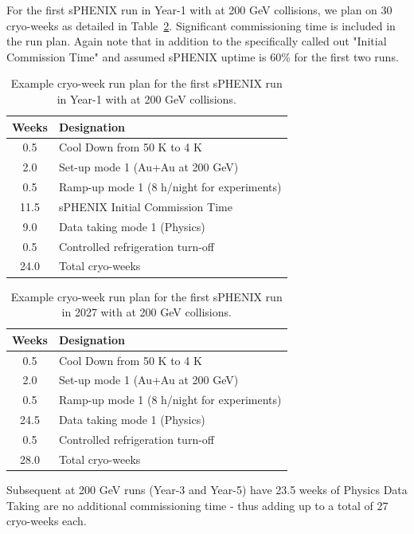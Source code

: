 For the first sPHENIX run in Year-1 with \auau at 200 GeV collisions, we plan on 30 cryo-weeks as detailed in Table~\ref{tab:cryoplan2022}.  Significant commissioning time is included in the run plan.   Again note that in addition to the specifically called out "Initial Commission Time" and assumed sPHENIX uptime is 60\% for the first two runs.

\begin{table}
\centering
\begin{tabular}{ | c | l | }
\hline
Weeks & Designation \\ \hline
0.5  & Cool Down from 50 K to 4 K \\ \hline
2.0  & Set-up mode 1 (Au+Au at 200 GeV) \\ \hline
0.5  & Ramp-up mode 1 (8 h/night for experiments) \\ \hline
11.5  & sPHENIX Initial Commission Time \\ \hline
9.0 & Data taking mode 1 (Physics) \\ \hline
0.5  & Controlled refrigeration turn-off \\ \hline \hline \hline
24.0 & Total cryo-weeks \\
\hline
\end{tabular}
\caption{Example cryo-week run plan for the first sPHENIX run in Year-1 with \auau at 200 GeV collisions.\label{tab:cryoplan2022}}
\end{table}

\begin{table}
\centering
\begin{tabular}{ | c | l | }
\hline
Weeks & Designation \\ \hline
0.5  & Cool Down from 50 K to 4 K \\ \hline
2.0  & Set-up mode 1 (Au+Au at 200 GeV) \\ \hline
0.5  & Ramp-up mode 1 (8 h/night for experiments) \\ \hline
24.5 & Data taking mode 1 (Physics) \\ \hline
0.5  & Controlled refrigeration turn-off \\ \hline \hline \hline
28.0 & Total cryo-weeks \\
\hline
\end{tabular}
\caption{Example cryo-week run plan for the first sPHENIX run in 2027 with \auau at 200 GeV collisions.\label{tab:cryoplan2022}}
\end{table}

Subsequent \auau at 200 GeV runs (Year-3 and Year-5) have 23.5 weeks of Physics Data Taking are no additional commissioning time - thus adding up to a total of 27 cryo-weeks each.   

